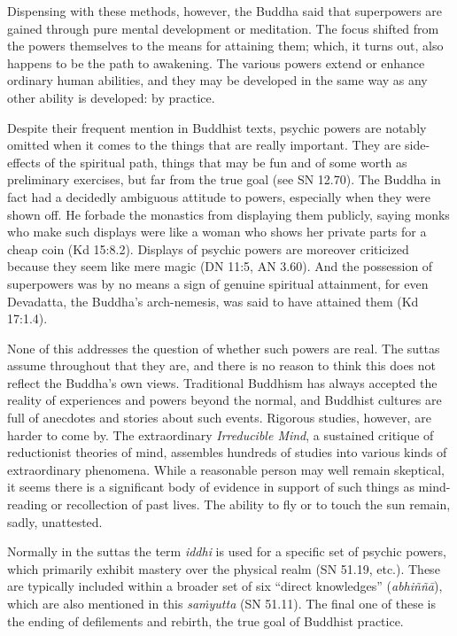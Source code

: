 \documentclass[12pt,openany]{book}%
\begin{document}
Dispensing with these methods, however, the Buddha said that superpowers are gained through pure mental development or meditation. The focus shifted from the powers themselves to the means for attaining them; which, it turns out, also happens to be the path to awakening. The various powers extend or enhance ordinary human abilities, and they may be developed in the same way as any other ability is developed: by practice.

Despite their frequent mention in Buddhist texts, psychic powers are notably omitted when it comes to the things that are really important. They are side-effects of the spiritual path, things that may be fun and of some worth as preliminary exercises, but far from the true goal (see SN 12.70). The Buddha in fact had a decidedly ambiguous attitude to powers, especially when they were shown off. He forbade the monastics from displaying them publicly, saying monks who make such displays were like a woman who shows her private parts for a cheap coin (Kd 15:8.2). Displays of psychic powers are moreover criticized because they seem like mere magic (DN 11:5, AN 3.60). And the possession of superpowers was by no means a sign of genuine spiritual attainment, for even Devadatta, the Buddha’s arch-nemesis, was said to have attained them (Kd 17:1.4).

None of this addresses the question of whether such powers are real. The suttas assume throughout that they are, and there is no reason to think this does not reflect the Buddha’s own views. Traditional Buddhism has always accepted the reality of experiences and powers beyond the normal, and Buddhist cultures are full of anecdotes and stories about such events. Rigorous studies, however, are harder to come by. The extraordinary \textit{Irreducible Mind}, a sustained critique of reductionist theories of mind, assembles hundreds of studies into various kinds of extraordinary phenomena. While a reasonable person may well remain skeptical, it seems there is a significant body of evidence in support of such things as mind-reading or recollection of past lives. The ability to fly or to touch the sun remain, sadly, unattested.

Normally in the suttas the term \textit{iddhi} is used for a specific set of psychic powers, which primarily exhibit mastery over the physical realm (SN 51.19, etc.). These are typically included within a broader set of six “direct knowledges” (\textit{\textsanskrit{abhiññā}}), which are also mentioned in this \textit{\textsanskrit{saṁyutta}} (SN 51.11). The final one of these is the ending of defilements and rebirth, the true goal of Buddhist practice.
\end{document}
